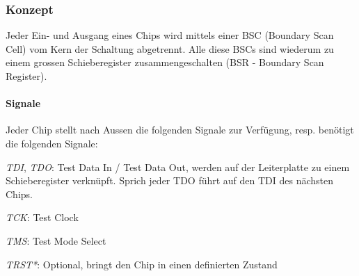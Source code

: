 \begin{multicols}{2}
    \subsubsection{Konzept}
    Jeder Ein- und Ausgang eines Chips wird mittels einer BSC (Boundary Scan Cell) vom Kern der Schaltung abgetrennt. Alle diese BSCs sind wiederum zu einem grossen Schieberegister zusammengeschalten (BSR - Boundary Scan Register).

    \paragraph{Signale}
    Jeder Chip stellt nach Aussen die folgenden Signale zur Verfügung, resp. benötigt die folgenden Signale:
    \begin{compactitem}
        \item \textit{TDI}, \textit{TDO}: Test Data In / Test Data Out, werden auf der Leiterplatte zu einem Schieberegister verknüpft. Sprich jeder TDO führt auf den TDI des nächsten Chips.
        \item \textit{TCK}: Test Clock
        \item \textit{TMS}: Test Mode Select
        \item \textit{TRST*}: Optional, bringt den Chip in einen definierten Zustand
    \end{compactitem}


\end{multicols}

